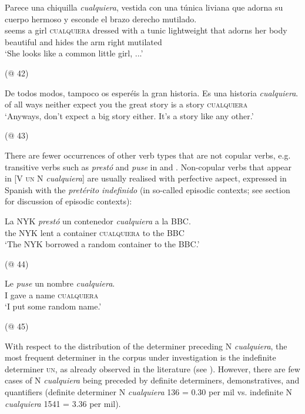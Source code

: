 \ea \label{bkm:Ref42868883} %
\gll Parece una chiquilla \textit{cualquiera}, vestida con una túnica liviana que adorna su cuerpo hermoso y esconde el brazo derecho mutilado.\\
seems a girl \textsc{cualquiera} dressed with a tunic lightweight that adorns her body beautiful and hides the arm right mutilated\\
\glt ‘She looks like a common little girl, ...’

  (@ 42)
\z


\ea \label{bkm:Ref42868888} %
\gll De todos modos, tampoco os esperéis la gran historia. Es una historia \textit{cualquiera}.\\
of all ways neither expect you the great story is a story \textsc{cualquiera}\\
\glt ‘Anyways, don’t expect a big story either. It’s a story like any other.’

  (@ 43)
\z

There are fewer occurrences of other verb types that are not copular verbs, e.g. transitive verbs such as \textit{prestó} and \textit{puse} in  and . Non-copular verbs that appear in [V \textsc{un} N \textit{cualquiera}] are usually realised with perfective aspect, expressed in Spanish with the \textit{pretérito indefinido} (in so-called episodic contexts; see section  for discussion of episodic contexts):

\ea \label{bkm:Ref42868870} %
\gll La NYK \textit{prestó} un contenedor \textit{cualquiera} a la BBC.\\
the NYK lent a container \textsc{cualquiera} to the BBC\\
\glt ‘The NYK borrowed a random container to the BBC.’

  (@ 44)
\z


\ea \label{bkm:Ref42869017} %
\gll Le \textit{puse} un nombre \textit{cualquiera}.\\
I gave a name \textsc{cualquiera}\\
\glt ‘I put some random name.’

  (@ 45)
\z

{With respect to the distribution of the determiner preceding N \textit{cualquiera}, the most frequent determiner in the corpus under investigation is the indefinite determiner \textsc{un}, as already observed in the literature (see ). However, there are few cases of N \textit{cualquiera} being preceded by definite determiners, demonstratives, and quantifiers (definite determiner N \textit{cualquiera} 136 = 0.30 per mil vs. indefinite N \textit{cualquiera} 1541 = 3.36 per mil).}

